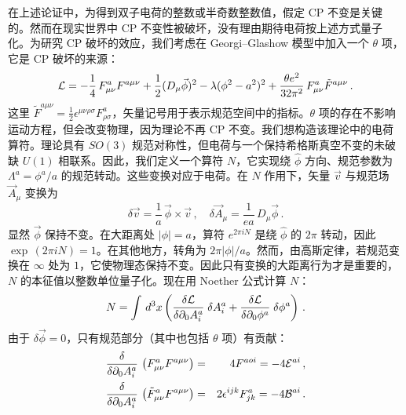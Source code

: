 在上述论证中，为得到双子电荷的整数或半奇数整数值，假定 CP 不变是关键的。然而在现实世界中 CP 不变性被破坏，没有理由期待电荷按上述方式量子化。为研究 CP 破坏的效应，我们考虑在 Georgi–Glashow 模型中加入一个 $\theta$ 项，它是 CP 破坏的来源：
\begin{equation}
{\cal L}=-\frac{1}{4}\,F^a_{\mu\nu}F^{a\mu\nu}+\frac{1}{2}
(D_{\mu} \vec{\phi})^{2} - \lambda (\phi^{2} - a^{2} )^{2}
+\frac{\theta e^2}{32\pi^2}\,F^a_{\mu\nu}\tilde F^{a\mu\nu}\,. 
\label{LXXVIII}
\end{equation}
这里 $\tilde F^{a\mu\nu}=\frac{1}{2}\epsilon^{\mu\nu\rho\sigma} F^a_{\rho\sigma}$，矢量记号用于表示规范空间中的指标。$\theta$ 项的存在不影响运动方程，但会改变物理，因为理论不再 CP 不变。我们想构造该理论中的电荷算符。理论具有 $SO(3)$ 规范对称性，但电荷与一个保持希格斯真空不变的未破缺 $U(1)$ 相联系。因此，我们定义一个算符 $N$，它实现绕 $\hat{\phi}$ 方向、规范参数为 $\Lambda^a = \phi^a/a$ 的规范转动。这些变换对应于电荷。在 $N$ 作用下，矢量 $\vec v $ 与规范场 $\vec A_\mu$ 变换为
$$
\delta \vec{v} = \frac{1}{a} \, \vec{\phi} \times \vec{v}\,, \quad
\delta \vec{A}_{\mu} = \frac{1}{ea} \, D_{\mu} \vec{\phi}\,.
$$
显然 $\vec{\phi}$ 保持不变。在大距离处 $|\phi|=a$，算符 $e^{2\pi i N}$ 是绕 $\hat{\phi}$ 的 $2 \pi$ 转动，因此 $\exp\,(2\pi iN)=1$。在其他地方，转角为 $2\pi |\phi|/a$。然而，由高斯定律，若规范变换在 $\infty$ 处为 $1$，它使物理态保持不变。因此只有变换的大距离行为才是重要的，$N$ 的本征值以整数单位量子化。现在用 Noether 公式计算 $N$：
$$
N=\int\,d^3x\left(\frac{\delta{\cal L}}{\delta\partial_0 A^a_i}\;
\delta A_{i}^{a} + \frac{\delta {\cal L}}{\delta \partial_{0}
\phi^{a}} \; \delta \phi^{a} \right )\,.
$$
由于 $\delta \vec\phi= 0$，只有规范部分（其中也包括 $\theta$ 项）有贡献：
\begin{eqnarray}
\frac{\delta}{\delta \partial_{0}A^{a}_{i}} \,
\left ( F^{a}_{\mu \nu} F^{a\mu\nu}\right) &=&
4F^{aoi} = -4 {\cal E}^{ai}\,, \nonumber\\
\frac{\delta}{\delta \partial_{0}A^{a}_{i}} \,
\left(\tilde{F}^a_{\mu\nu}F^{a\mu\nu}\right) &=&
2\epsilon^{ijk}F^a_{jk} =-4 {\cal B}^{ai}\,. \nonumber
\end{eqnarray}
